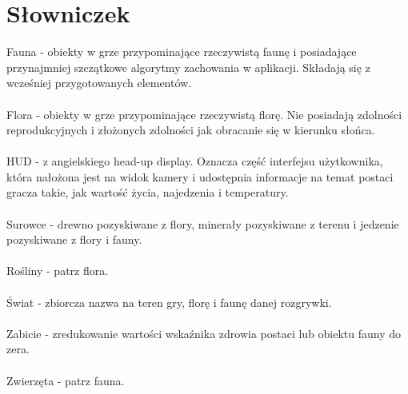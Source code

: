 \chapter{Słowniczek}
\noindent
Fauna - obiekty w grze przypominające rzeczywistą faunę i posiadające przynajmniej szczątkowe algorytmy zachowania w aplikacji. Składają się z wcześniej przygotowanych elementów.
\\
\\
\noindent
Flora - obiekty w grze przypominające rzeczywistą florę. Nie posiadają zdolności reprodukcyjnych i złożonych zdolności jak obracanie się w kierunku słońca.
\\
\\
\noindent
HUD - z angielskiego head-up display. Oznacza część interfejsu użytkownika, która nałożona jest na widok kamery i udostępnia informacje na temat postaci gracza takie, jak wartość życia, najedzenia i temperatury.
\\
\\
\noindent
Surowce - drewno pozyskiwane z flory, minerały pozyskiwane z terenu i jedzenie pozyskiwane z flory i fauny.
\\
\\
\noindent
Rośliny - patrz flora.
\\
\\
\noindent
Świat - zbiorcza nazwa na teren gry, florę i faunę danej rozgrywki.
\\
\\
\noindent
Zabicie - zredukowanie wartości wskaźnika zdrowia postaci lub obiektu fauny do zera.
\\
\\
\noindent
Zwierzęta - patrz fauna.